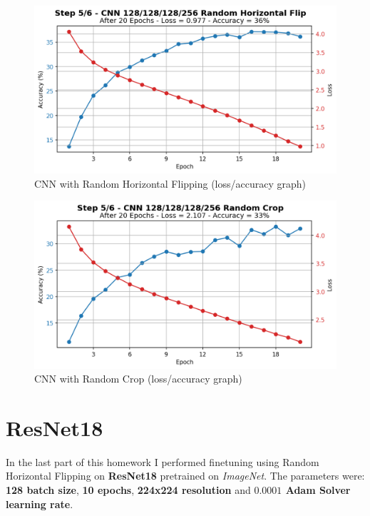 \documentclass[a4paper, 11pt]{article}
\begin{document}
	\begin{figure}[ht!]
		\centering
		\includegraphics[width=0.65\paperwidth]{img/fig05a.png}
		\caption{CNN with Random Horizontal Flipping (loss/accuracy graph)}
		\label{fig:05a}
	\end{figure}
	\begin{figure}[ht!]
		\centering
		\includegraphics[width=0.65\paperwidth]{img/fig05b.png}
		\caption{CNN with Random Crop (loss/accuracy graph)}
		\label{fig:05b}
	\end{figure}
	\FloatBarrier	
	
	\section{ResNet18} \label{final}
	
	In the last part of this homework I performed finetuning using Random Horizontal Flipping on \textbf{ResNet18} pretrained on \textit{ImageNet}. The parameters were: \textbf{128 batch size}, \textbf{10 epochs}, \textbf{224x224 resolution} and \textbf{$\boldsymbol{0.0001}$ Adam Solver learning rate}.
	
%	
%	
	
\end{document}
